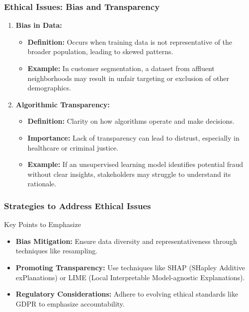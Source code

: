 \documentclass[aspectratio=169]{beamer}
\begin{document}
\begin{frame}
    \frametitle{Ethical Issues: Bias and Transparency}
    \begin{enumerate}
        \item \textbf{Bias in Data:}
            \begin{itemize}
                \item \textbf{Definition:} Occurs when training data is not representative of the broader population, leading to skewed patterns.
                \item \textbf{Example:} In customer segmentation, a dataset from affluent neighborhoods may result in unfair targeting or exclusion of other demographics.
            \end{itemize}

        \item \textbf{Algorithmic Transparency:}
            \begin{itemize}
                \item \textbf{Definition:} Clarity on how algorithms operate and make decisions. 
                \item \textbf{Importance:} Lack of transparency can lead to distrust, especially in healthcare or criminal justice.
                \item \textbf{Example:} If an unsupervised learning model identifies potential fraud without clear insights, stakeholders may struggle to understand its rationale.
            \end{itemize}
    \end{enumerate}
\end{frame}

\begin{frame}[fragile]
    \frametitle{Strategies to Address Ethical Issues}
    \begin{block}{Key Points to Emphasize}
        \begin{itemize}
            \item \textbf{Bias Mitigation:} Ensure data diversity and representativeness through techniques like resampling.
            \item \textbf{Promoting Transparency:} Use techniques like SHAP (SHapley Additive exPlanations) or LIME (Local Interpretable Model-agnostic Explanations).
            \item \textbf{Regulatory Considerations:} Adhere to evolving ethical standards like GDPR to emphasize accountability.
        \end{itemize}
    \end{block}
\end{frame}
\end{document}

